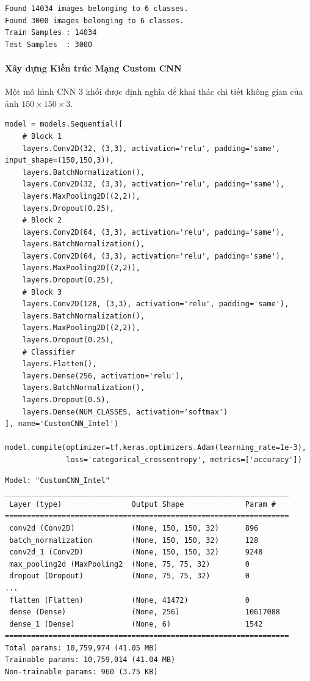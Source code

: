 \begin{lstlisting}[style=consoleoutput, caption={Output: Xác nhận số lượng hình ảnh Generators}]
Found 14034 images belonging to 6 classes.
Found 3000 images belonging to 6 classes.
Train Samples : 14034
Test Samples  : 3000
\end{lstlisting}

\paragraph{Xây dựng Kiến trúc Mạng Custom CNN} \hfill\mbox{}

Một mô hình CNN 3 khối được định nghĩa để khai thác chi tiết không gian của ảnh $150 \times 150 \times 3$.

\begin{lstlisting}[style=pythoncode, caption={Định nghĩa Kiến trúc Mạng Nơ-ron Tích chập}]
model = models.Sequential([
    # Block 1
    layers.Conv2D(32, (3,3), activation='relu', padding='same', input_shape=(150,150,3)),
    layers.BatchNormalization(),
    layers.Conv2D(32, (3,3), activation='relu', padding='same'),
    layers.MaxPooling2D((2,2)),
    layers.Dropout(0.25),
    # Block 2
    layers.Conv2D(64, (3,3), activation='relu', padding='same'),
    layers.BatchNormalization(),
    layers.Conv2D(64, (3,3), activation='relu', padding='same'),
    layers.MaxPooling2D((2,2)),
    layers.Dropout(0.25),
    # Block 3
    layers.Conv2D(128, (3,3), activation='relu', padding='same'),
    layers.BatchNormalization(),
    layers.MaxPooling2D((2,2)),
    layers.Dropout(0.25),
    # Classifier
    layers.Flatten(),
    layers.Dense(256, activation='relu'),
    layers.BatchNormalization(),
    layers.Dropout(0.5),
    layers.Dense(NUM_CLASSES, activation='softmax')
], name='CustomCNN_Intel')

model.compile(optimizer=tf.keras.optimizers.Adam(learning_rate=1e-3),
              loss='categorical_crossentropy', metrics=['accuracy'])
\end{lstlisting}

\begin{lstlisting}[style=consoleoutput, caption={Output: Tóm tắt Mạng nơ-ron (Model Summary)}]
Model: "CustomCNN_Intel"
_________________________________________________________________
 Layer (type)                Output Shape              Param #   
=================================================================
 conv2d (Conv2D)             (None, 150, 150, 32)      896       
 batch_normalization         (None, 150, 150, 32)      128       
 conv2d_1 (Conv2D)           (None, 150, 150, 32)      9248      
 max_pooling2d (MaxPooling2  (None, 75, 75, 32)        0         
 dropout (Dropout)           (None, 75, 75, 32)        0         
...
 flatten (Flatten)           (None, 41472)             0         
 dense (Dense)               (None, 256)               10617088  
 dense_1 (Dense)             (None, 6)                 1542      
=================================================================
Total params: 10,759,974 (41.05 MB)
Trainable params: 10,759,014 (41.04 MB)
Non-trainable params: 960 (3.75 KB)
\end{lstlisting}

